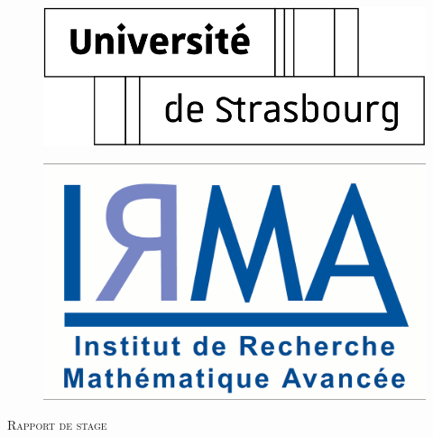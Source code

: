 \documentclass[ 
11pt, %
french, %
singlespacing, %
parskip, %
headsepline, %
openany, %
]{MastersDoctoralThesis} %
\author{Roussel Desmond \textsc{Nzoyem}} %
\begin{document}
\frontmatter %

\pagestyle{plain} %


\begin{titlepage}

\begin{figure}[!htb]
   \begin{minipage}{0.40\textwidth}
     \centering
     \includegraphics[width=.7\linewidth]{LogoUnistra}
     \label{Fig:LogoUnistra}
   \end{minipage}\hfill
   \begin{minipage}{0.30\textwidth}
     \centering
     \includegraphics[width=.7\linewidth]{LogoIRMA}
     \label{Fig:LogoIRMA}
   \end{minipage}
\end{figure}


\begin{center}

\vspace*{.06\textheight}
\textsc{\Large Rapport de stage}\\[0.5cm] %


\end{center}
\end{titlepage}
\end{document}
